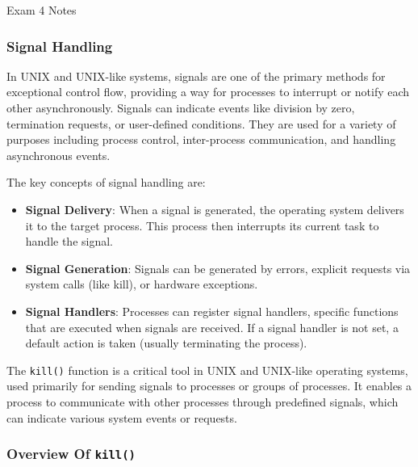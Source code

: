 \begin{examnotes}{Exam 4 Notes}
    \subsubsection*{Signal Handling}

    In UNIX and UNIX-like systems, signals are one of the primary methods for exceptional control flow, providing a way for processes to interrupt or notify each other asynchronously. Signals can 
    indicate events like division by zero, termination requests, or user-defined conditions. They are used for a variety of purposes including process control, inter-process communication, and 
    handling asynchronous events.

    The key concepts of signal handling are:

    \begin{itemize}
        \item \textbf{Signal Delivery}: When a signal is generated, the operating system delivers it to the target process. This process then interrupts its current task to handle the signal.
        \item \textbf{Signal Generation}: Signals can be generated by errors, explicit requests via system calls (like kill), or hardware exceptions.
        \item \textbf{Signal Handlers}: Processes can register signal handlers, specific functions that are executed when signals are received. If a signal handler is not set, a default action is 
        taken (usually terminating the process).
    \end{itemize}

    \begin{highlight}
        The \texttt{kill()} function is a critical tool in UNIX and UNIX-like operating systems, used primarily for sending signals to processes or groups of processes. It enables a process to communicate 
        with other processes through predefined signals, which can indicate various system events or requests.

        \subsubsection*{Overview Of \texttt{kill()}}


\end{highlight}
\end{examnotes}
